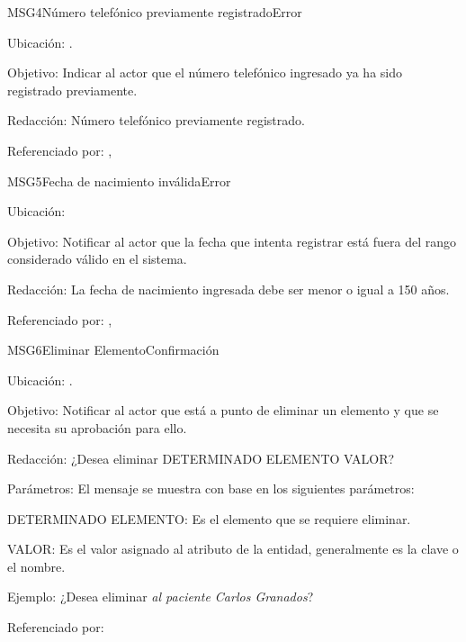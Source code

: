 \begin{mensaje}{MSG4}{Número telefónico previamente registrado}{Error}
	\item[Ubicación:] \msjCampo.
	\item[Objetivo:] Indicar al actor que el número telefónico ingresado ya ha sido registrado previamente.
	\item[Redacción:] Número telefónico previamente registrado.
	\item[Referenciado por:] , 
\end{mensaje}


\begin{mensaje}{MSG5}{Fecha de nacimiento inválida}{Error}
	\item[Ubicación:] \msjCampo

	\item[Objetivo:] Notificar al actor que la fecha que intenta registrar está fuera del rango considerado válido en el sistema.	
	
	\item[Redacción:] La fecha de nacimiento ingresada debe ser menor o igual a 150 años.
	
	\item[Referenciado por:] , 
\end{mensaje}


\begin{mensaje}{MSG6}{Eliminar Elemento}{Confirmación}
	\item[Ubicación:] \msjEmergente.
	\item[Objetivo:] Notificar al actor que está a punto de eliminar un elemento y que se necesita su aprobación para ello.
	\item[Redacción:] ¿Desea eliminar DETERMINADO ELEMENTO VALOR?
	\item[Parámetros:] El mensaje se muestra con base en los siguientes parámetros:
	\begin{Citemize} 
		\item DETERMINADO ELEMENTO: Es el elemento que se requiere eliminar.
		\item VALOR: Es el valor asignado al atributo de la entidad, generalmente es la clave o el nombre.
	\end{Citemize}
	\item[Ejemplo:] ¿Desea eliminar {\em al paciente Carlos Granados}?
	\item[Referenciado por:] 

\end{mensaje}

